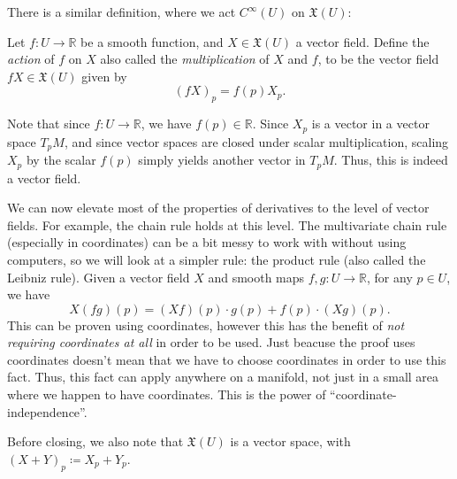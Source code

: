 There is a similar definition, where we act $C^\infty (U)$ on $\mathfrak{X} (U)$:

\begin{definition}\label{dfn:3-6}
	Let $f : U \to \mathbb{R} $ be a smooth function, and $X\in \mathfrak{X} (U)$ a vector field. Define the \emph{action} of $f$ on $X$ also called the \emph{multiplication} of $X$ and $f$, to be the vector field $fX\in \mathfrak{X} (U)$ given by
	\[
		(fX)_p = f(p)X_p
	.\]
\end{definition}
Note that since $f : U \to \mathbb{R} $, we have $f(p)\in\mathbb{R} $. Since $X_p$ is a vector in a vector space $T_pM$, and since vector spaces are closed under scalar multiplication, scaling $X_p$ by the scalar $f(p)$ simply yields another vector in $T_pM$. Thus, this is indeed a vector field.

We can now elevate most of the properties of derivatives to the level of vector fields. For example, the chain rule holds at this level. The multivariate chain rule (especially in coordinates) can be a bit messy to work with without using computers, so we will look at a simpler rule: the product rule (also called the Leibniz rule). Given a vector field $X$ and smooth maps $f,g : U \to \mathbb{R} $, for any $p\in U$, we have
\[
	X(fg)(p) = (Xf)(p)\cdot g(p) + f(p)\cdot (Xg)(p)
.\]
This can be proven using coordinates, however this has the benefit of \emph{not requiring coordinates at all} in order to be used. Just beacuse the proof uses coordinates doesn't mean that we have to choose coordinates in order to use this fact. Thus, this fact can apply anywhere on a manifold, not just in a small area where we happen to have coordinates. This is the power of ``coordinate-independence''.

Before closing, we also note that $\mathfrak{X} (U)$ is a vector space, with $(X+Y)_p \coloneqq X_p + Y_p$.
